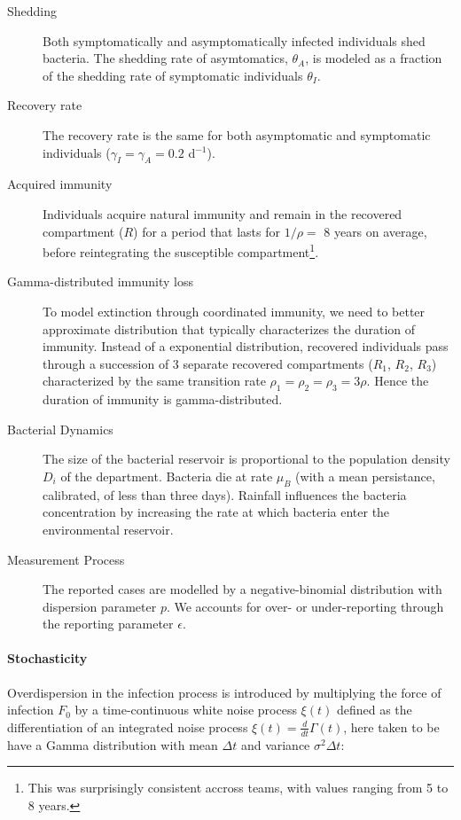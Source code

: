 \begin{description}
    \item[Shedding] Both symptomatically and asymptomatically infected individuals shed bacteria. The shedding rate of asymtomatics, $\theta_A$, is modeled as a fraction of the shedding rate of symptomatic individuals  $\theta_I$\cite{Kuhn:GlucoseNotRiceBased:2014}.
    \item[Recovery rate] The recovery rate is the same for both asymptomatic and symptomatic individuals ($\gamma_I=\gamma_A=0.2$ d$^{-1}$)\cite{Kaper:Cholera:1995, Codeco:EndemicEpidemicDynamics:2001}.
    \item[Acquired immunity] Individuals acquire natural immunity and remain in the recovered compartment ($R$) for a period that lasts for $1/\rho=$ 8 years on average, before reintegrating the susceptible compartment\footnote{This was surprisingly consistent accross teams, with values ranging from 5 to 8 years.}.
    \item[Gamma-distributed immunity loss] To model extinction through coordinated immunity, we need to better approximate distribution that typically characterizes the duration of immunity\cite{King:InapparentInfectionsCholera:2008}. Instead of a exponential distribution, recovered individuals pass through a succession of 3 separate recovered compartments ($R_1$, $R_2$, $R_3$) characterized by the same transition rate $\rho_1=\rho_2=\rho_3=3\rho$. Hence the duration of immunity is gamma-distributed.
    \item[Bacterial Dynamics] The size of the bacterial reservoir is proportional to the population density $D_i$ of the department. Bacteria die at rate $\mu_B$ (with a mean persistance, calibrated, of less than three days). Rainfall influences the bacteria concentration by increasing the rate at which bacteria enter the environmental reservoir.
    \item[Measurement Process] The reported cases are modelled by a negative-binomial distribution with dispersion parameter $p$. We accounts for over- or under-reporting through the reporting parameter $\epsilon$.
\end{description}
    
    
\paragraph{Stochasticity} Overdispersion in the infection process is introduced by multiplying the force of infection $F_0$ by a time-continuous white noise process \(\xi(t)\) defined as the differentiation of an integrated noise process \(\xi(t) = \frac{d}{dt}\Gamma(t)\), here taken to be have a Gamma distribution with mean \(\Delta t\) and variance \(\sigma^2 \Delta t\)\cite[-3\baselineskip]{Breto:CompoundMarkovCounting:2011}:

